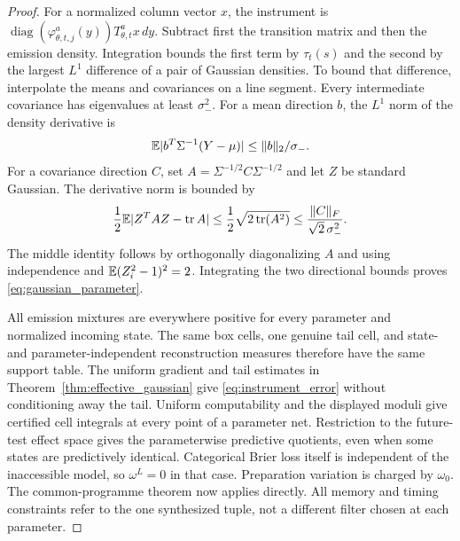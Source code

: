 \begin{proof}
For a normalized column vector $x$, the instrument is
$\operatorname{diag}(\varphi_{\theta,t,j}^a(y))T_{\theta,t}^a x\,dy$.
Subtract first the transition matrix and then the emission density. Integration bounds the first term by $\tau_t(s)$ and the second by the largest $L^1$ difference of a pair of Gaussian densities. To bound that difference, interpolate the means and covariances on a line segment. Every intermediate covariance has eigenvalues at least $\sigma_-^2$. For a mean direction $b$, the $L^1$ norm of the density derivative is
\[
 \mathbb E|b^T\Sigma^{-1}(Y-\mu)|\le\|b\|_2/\sigma_-.
\]
For a covariance direction $C$, set $A=\Sigma^{-1/2}C\Sigma^{-1/2}$ and let $Z$ be standard Gaussian. The derivative norm is bounded by
\[
 \frac12\mathbb E|Z^TAZ-\operatorname{tr} A|
 \le\frac12\sqrt{2\operatorname{tr}(A^2)}
 \le\frac{\|C\|_F}{\sqrt2\,\sigma_-^2}.
\]
The middle identity follows by orthogonally diagonalizing $A$ and using independence and $\mathbb E(Z_i^2-1)^2=2$. Integrating the two directional bounds proves \eqref{eq:gaussian_parameter}.

All emission mixtures are everywhere positive for every parameter and normalized incoming state. The same box cells, one genuine tail cell, and state- and parameter-independent reconstruction measures therefore have the same support table. The uniform gradient and tail estimates in Theorem~\ref{thm:effective_gaussian} give \eqref{eq:instrument_error} without conditioning away the tail. Uniform computability and the displayed moduli give certified cell integrals at every point of a parameter net. Restriction to the future-test effect space gives the parameterwise predictive quotients, even when some states are predictively identical. Categorical Brier loss itself is independent of the inaccessible model, so $\omega^L=0$ in that case. Preparation variation is charged by $\omega_0$. The common-programme theorem now applies directly. All memory and timing constraints refer to the one synthesized tuple, not a different filter chosen at each parameter.
\end{proof}

